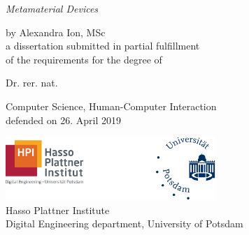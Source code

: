 



\thispagestyle{empty}
\vspace*{\fill}
\vspace{40pt}
\begin{center}
\fontsize{36}{40}\textit{Metamaterial Devices}
\normalsize 

\vspace{25pt}
by Alexandra Ion, MSc\\

\vspace{75pt}
a dissertation submitted in partial fulfillment\\
of the requirements for the degree of \\
\vspace{8pt}

\Large 
{Dr. rer. nat.} \\
\normalsize 

\vspace{15pt}
Computer Science, Human-Computer Interaction \\
defended on 26. April 2019 \\

\vspace{100pt}

\includegraphics[width=225pt]{frontmatter/logo/logo_hpi-UP.eps} \\
Hasso Plattner Institute \\
Digital Engineering department, University of Potsdam \\

\end{center}
\vspace*{\fill}
